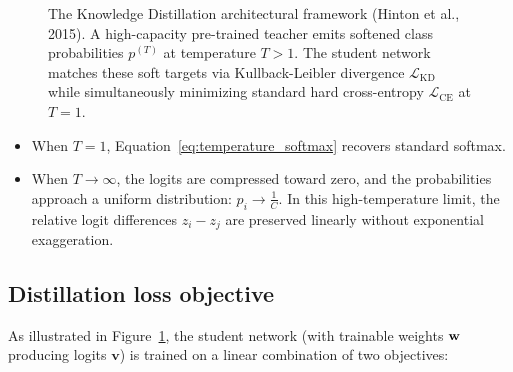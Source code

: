 \begin{figure}[H]
\caption{The Knowledge Distillation architectural framework (Hinton et al., 2015). A high-capacity pre-trained teacher emits softened class probabilities $p^{(T)}$ at temperature $T > 1$. The student network matches these soft targets via Kullback-Leibler divergence $\mathcal{L}_{\text{KD}}$ while simultaneously minimizing standard hard cross-entropy $\mathcal{L}_{\text{CE}}$ at $T=1$.}
\label{fig:knowledge_distillation_architecture}
\end{figure}

\begin{itemize}[leftmargin=*]
  \item When $T = 1$, Equation~\eqref{eq:temperature_softmax} recovers standard softmax.
  \item When $T \to \infty$, the logits are compressed toward zero, and the probabilities approach a uniform distribution: $p_i \to \frac{1}{C}$. In this high-temperature limit, the relative logit differences $z_i - z_j$ are preserved linearly without exponential exaggeration.
\end{itemize}

\subsection{Distillation loss objective}
\label{sec:dual_distillation_objective}

As illustrated in Figure~\ref{fig:knowledge_distillation_architecture}, the student network (with trainable weights $\mathbf{w}$ producing logits $\mathbf{v}$) is trained on a linear combination of two objectives:

